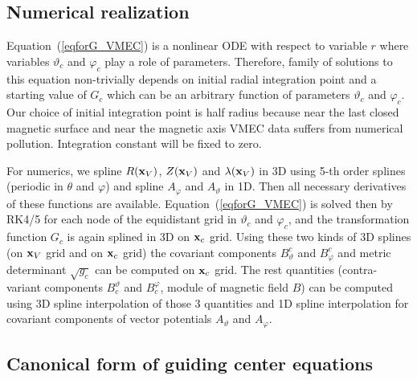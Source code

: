 \documentclass[12pt]{article}
\newcommand{\eq}[1]{(\ref{#1})}
\newcommand{\bx}{{\bf x}}
\begin{document}
\subsection{Numerical realization}

\noindent
Equation~\eq{eqforG_VMEC} is a nonlinear ODE with respect to variable $r$ where variables $\vartheta_c$
and $\varphi_c$ play a role of parameters. Therefore, family of solutions to this equation non-trivially
depends on initial radial integration point and a starting value of $G_c$ which can be an arbitrary function
of parameters $\vartheta_c$ and $\varphi_c$. Our choice of initial integration point is half radius because
near the last closed magnetic surface and near the magnetic axis VMEC data suffers from numerical pollution.
Integration constant will be fixed to zero.

For numerics, we spline $R(\bx_V)$, $Z(\bx_V)$ and $\lambda(\bx_V)$ in 3D using 5-th order splines (periodic
in $\theta$ and $\varphi$) and spline $A_\varphi$ and $A_\vartheta$ in 1D. Then all necessary derivatives of 
these functions are available. Equation~\eq{eqforG_VMEC} is solved then by RK4/5 for each node of the 
equidistant grid in $\vartheta_c$ and $\varphi_c$, and the transformation function $G_c$ is again splined
in 3D on $\bx_c$ grid. Using these two kinds of 3D splines (on $\bx_V$ grid and on $\bx_c$ grid) the covariant
components $B^c_\vartheta$ and $B^c_\varphi$ and metric determinant $\sqrt{g_c}$ can be computed on $\bx_c$
grid. The rest quantities (contra-variant components $B_c^\vartheta$ and $B_c^\varphi$, module of magnetic field 
$B$) can be computed using 3D spline interpolation of those 3 quantities and 1D spline interpolation for 
covariant components of vector potentials $A_\vartheta$ and $A_\varphi$.



\subsection{Canonical form of guiding center equations} 
\end{document}
